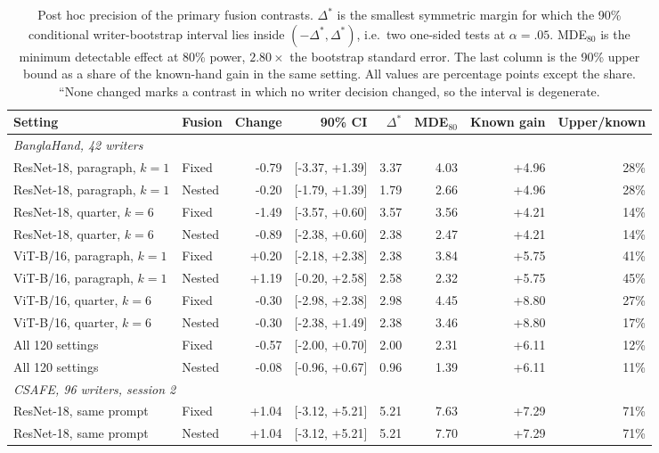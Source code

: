 \begin{table}[ht]
\caption{Post hoc precision of the primary fusion contrasts. $\Delta^*$ is the smallest symmetric margin for which the 90\% conditional writer-bootstrap interval lies inside $(-\Delta^*,\Delta^*)$, i.e.\ two one-sided tests at $\alpha=.05$. MDE$_{80}$ is the minimum detectable effect at 80\% power, $2.80\times$ the bootstrap standard error. The last column is the 90\% upper bound as a share of the known-hand gain in the same setting. All values are percentage points except the share. ``None changed marks a contrast in which no writer decision changed, so the interval is degenerate.}\label{tab:precision}
\centering\footnotesize\setlength{\tabcolsep}{3.5pt}
\begin{tabular}{llrrrrrr}\toprule
Setting & Fusion & Change & 90\% CI & $\Delta^*$ & MDE$_{80}$ & Known gain & Upper/known\\\midrule
\multicolumn{8}{l}{\emph{BanglaHand, 42 writers}}\\
ResNet-18, paragraph, $k=1$ & Fixed & -0.79 & [-3.37, +1.39] & 3.37 & 4.03 & +4.96 & 28\% \\
ResNet-18, paragraph, $k=1$ & Nested & -0.20 & [-1.79, +1.39] & 1.79 & 2.66 & +4.96 & 28\% \\
ResNet-18, quarter, $k=6$ & Fixed & -1.49 & [-3.57, +0.60] & 3.57 & 3.56 & +4.21 & 14\% \\
ResNet-18, quarter, $k=6$ & Nested & -0.89 & [-2.38, +0.60] & 2.38 & 2.47 & +4.21 & 14\% \\
ViT-B/16, paragraph, $k=1$ & Fixed & +0.20 & [-2.18, +2.38] & 2.38 & 3.84 & +5.75 & 41\% \\
ViT-B/16, paragraph, $k=1$ & Nested & +1.19 & [-0.20, +2.58] & 2.58 & 2.32 & +5.75 & 45\% \\
ViT-B/16, quarter, $k=6$ & Fixed & -0.30 & [-2.98, +2.38] & 2.98 & 4.45 & +8.80 & 27\% \\
ViT-B/16, quarter, $k=6$ & Nested & -0.30 & [-2.38, +1.49] & 2.38 & 3.46 & +8.80 & 17\% \\
All 120 settings & Fixed & -0.57 & [-2.00, +0.70] & 2.00 & 2.31 & +6.11 & 12\% \\
All 120 settings & Nested & -0.08 & [-0.96, +0.67] & 0.96 & 1.39 & +6.11 & 11\% \\
\midrule
\multicolumn{8}{l}{\emph{CSAFE, 96 writers, session 2}}\\
ResNet-18, same prompt & Fixed & +1.04 & [-3.12, +5.21] & 5.21 & 7.63 & +7.29 & 71\% \\
ResNet-18, same prompt & Nested & +1.04 & [-3.12, +5.21] & 5.21 & 7.70 & +7.29 & 71\% \\

\end{tabular}
\end{table}
